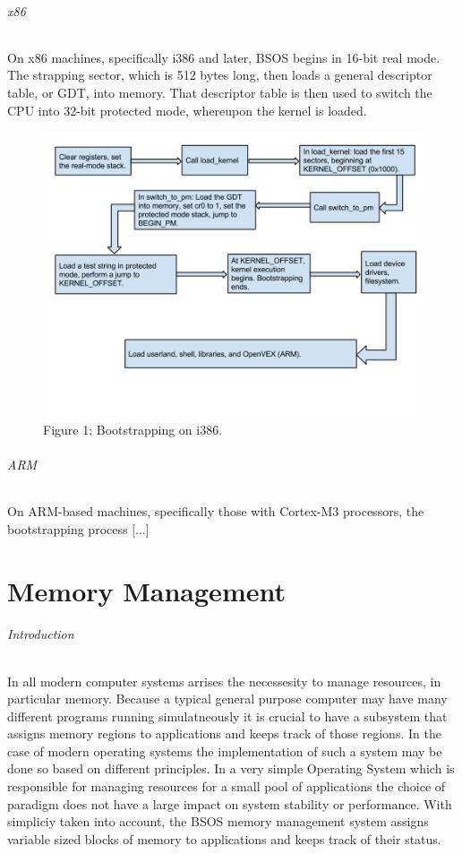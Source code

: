\documentclass[english]{article}
\begin{document}
\paragraph{x86}
On x86 machines, specifically i386 and later, BSOS begins in 16-bit real mode. The strapping sector, which is 512 bytes long, then loads a general descriptor table, or GDT, into memory. That descriptor table is then used to switch the CPU into 32-bit protected mode, whereupon the kernel is loaded.
\begin{figure}[h!]
\centerline{\includegraphics[scale=0.4]{imgs/boot_x86.png}}
\caption{Figure 1: Bootstrapping on i386.}
\end{figure}

\paragraph{ARM}
On ARM-based machines, specifically those with Cortex-M3 processors, the bootstrapping process [...]


\part{Memory Management}

\paragraph{Introduction}
In all modern computer systems arrises the necessesity to manage resources, in particular memory. Because a typical general purpose computer
may have many different programs running simulatneously it is crucial to have a subsystem that assigns memory regions to applications and keeps
track of those regions. In the case of modern operating systems the implementation of such a system may be done so based on different principles.
In a very simple Operating System which is responsible for managing resources for a small pool of applications the choice of paradigm does not have a large impact on system stability or performance.
With simpliciy taken into account, the BSOS memory management system assigns variable sized blocks of memory to applications and keeps track of their status.
\end{document}
